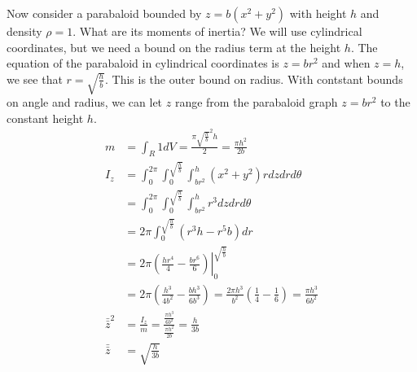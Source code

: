 \documentclass[fleqn,letterpaper]{report}
\begin{document}
\begin{example}
Now consider a parabaloid bounded by $z = b(x^2 + y^2)$ with
height $h$ and density $\rho = 1$. What are its moments of
inertia? We will use cylindrical coordinates, but we need a
bound on the radius term at the height $h$. The equation of
the parabaloid in cylindrical coordinates is $z = br^2$ and
when $z=h$, we see that $r = \sqrt{\frac{h}{b}}$. This is the
outer bound on radius. With contstant bounds on angle and
radius, we can let $z$ range from the parabaloid graph
$z=br^2$ to the constant height $h$.
\begin{align*}
m & = \int_R 1 dV = \frac{\pi \sqrt{\frac{h}{b}}^2h}{2} =
\frac{\pi h^2}{2b} \\
I_z & = \int_0^{2\pi} \int_0^{\sqrt{\frac{h}{b}}}
\int_{br^2}^h (x^2 + y^2) r dz dr d\theta \\
& = \int_0^{2\pi} \int_0^{\sqrt{\frac{h}{b}}} \int_{br^2}^h
r^3 dz dr d\theta \\
& = 2\pi \int_0^{\sqrt{\frac{h}{b}}} \left( r^3h - r^5 b \right) dr \\
& = 2\pi \left. \left( \frac{hr^4}{4} - \frac{br^6}{6}
\right) \right|_0^{\sqrt{\frac{h}{b}}} \\
& = 2\pi \left( \frac{h^3}{4b^2} - \frac{bh^3}{6b^3} \right)
= \frac{2\pi h^3}{b^2} \left( \frac{1}{4} - \frac{1}{6}
\right) = \frac{\pi h^3}{6b^2} \\
\bar{\bar{z}}^2 & = \frac{I_z}{m} = \frac{\frac{\pi
h^3}{6b^2}}{\frac{\pi h^2}{2b}} = \frac{h}{3b} \\
\bar{\bar{z}} & = \sqrt{\frac{h}{3b}}
\end{align*}


\end{example}
\end{document}
